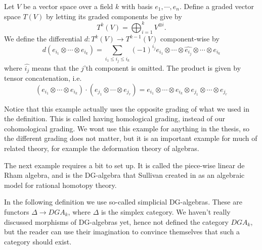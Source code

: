 \begin{example}
Let $V$ be a vector space over a field $k$ with basis $e_1, \cdots, e_n$. Define a graded vector space $T(V)$ by letting its graded components be give by
\begin{equation*}
    T^k(V) = \bigoplus_{i=1}^k V^{\otimes i}.
\end{equation*}
We define the differential $d\colon T^k(V)\longrightarrow T^{k-1}(V)$ component-wise by
\begin{equation*}
    d(e_{i_1}\otimes \cdots \otimes e_{i_k}) = \sum_{i_1\leq i_j\leq i_k}(-1)^{i_j}e_{i_1}\otimes \cdots \otimes \widehat{e_{i_j}}\otimes \cdots \otimes e_{i_k}
\end{equation*}
where $\widehat{i_j}$ means that the $j$'th component is omitted. The product is given by tensor concatenation, i.e. 
\begin{equation*}
    (e_{i_1}\otimes \cdots \otimes e_{i_k})\cdot(e_{j_1}\otimes \cdots \otimes e_{j_r}) = e_{i_1}\otimes \cdots \otimes e_{i_k}\otimes e_{j_1}\otimes \cdots \otimes e_{j_r}
\end{equation*}
\end{example}

Notice that this example actually uses the opposite grading of what we used in the definition. This is called having homological grading, instead of our cohomological grading. We wont use this example for anything in the thesis, so the different grading does not matter, but it is an important example for much of related theory, for example the deformation theory of algebras. 

The next example requires a bit to set up. It is called the piece-wise linear de Rham algebra, and is the DG-algebra that Sullivan created in \cite{Sullivan} as an algebraic model for rational homotopy theory. 

In the following definition we use so-called simplicial DG-algebras. These are functors $\Delta \longrightarrow DGA_k$, where $\Delta$ is the simplex category. We haven't really discussed morphisms of DG-algebras yet, hence not defined the category $DGA_k$, but the reader can use their imagination to convince themselves that such a category should exist. 

